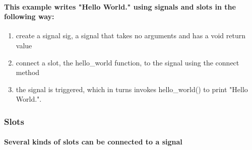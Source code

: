 \documentclass[9pt,onside,a4paper]{article}
\newcommand{\hlkwd}[1]{\textcolor[rgb]{0.82,0.11,0.93}{#1}}
\begin{document}
\paragraph{This example writes "Hello World." using signals and slots in the following way:}
\begin{enumerate}
\item create a signal \hlkwd{sig}, a signal that takes no arguments and has a void return value 
\item connect a slot, the \hlkwd{hello\_world} function, to the signal using the \hlkwd{connect} method
\item the signal is triggered, which in turns invokes \hlkwd{hello\_world()} to print "Hello World.".
\end{enumerate}


\subsubsection{Slots}

\paragraph{Several kinds of slots can be connected to a signal}
\end{document}
